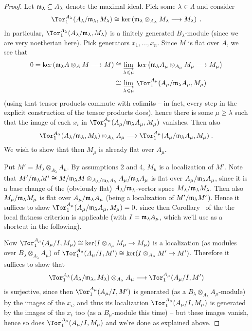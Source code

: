 \documentclass[a4paper,parskip=half,numbers=enddot, DIV=12]{scrreprt}
\renewcommand{\geq}{\geqslant}
\renewcommand{\leq}{\leqslant}
\begin{document}
\begin{proof}
	Let $\mathfrak{m}_\lambda\subseteq A_\lambda$ denote the maximal ideal. Pick some $\lambda\in\Lambda$ and consider
	\begin{align*}
	\Tor_1^{A_\lambda}(A_\lambda/\mm_\lambda,M_\lambda)\cong\ker\left(\mm_\lambda\otimes_{A_\lambda}M_\lambda\morphism M_\lambda\right)\;.
	\end{align*}
	In particular, $\Tor_1^{A_\lambda}(A_\lambda/\mm_\lambda,M_\lambda)$ is a finitely generated $B_\lambda$-module (since we are very noetherian here). Pick generators $x_1,\ldots,x_n$. Since $M$ is flat over $A$, we see that
	\begin{align*}
	0=\ker\left(\mm_\lambda A\otimes_AM\morphism M\right)&\cong\colimit[\lambda\leq\mu]\ker\left(\mm_\lambda A_\mu\otimes_{A_\mu}M_\mu\morphism M_\mu\right)\\
	&\cong \colimit[\lambda\leq\mu]\Tor_1^{A_\mu}(A_\mu/\mm_\lambda A_\mu,M_\mu)
	\end{align*}
	(using that tensor products commute with colimits -- in fact, every step in the explicit construction of the tensor products does), hence there is some $\mu\geq \lambda$ such that the image of each $x_i$ in $\Tor_1^{A_\mu}(A_\mu/\mm_\lambda A_\mu,M_\mu)$ vanishes. Then also \begin{align*}
	\Tor_1^{A_\lambda}(A_\lambda/\mm_\lambda,M_\lambda)\otimes_{A_\lambda}A_\mu\morphism \Tor_1^{A_{\mu}}(A_\mu/\mm_\lambda A_\mu,M_\mu)\;.
	\end{align*}
	We wish to show that then $M_\mu$ is already flat over $A_\mu$.
	
	Put $M'=M_\lambda\otimes_{A_\lambda}A_\mu$. By assumptions 2 and 4, $M_\mu$ is a localization of $M'$. Note that $M'/\mathfrak{m}_\lambda M'\cong M/\mathfrak{m}_\lambda M\otimes_{A_\lambda/\mathfrak{m}_\lambda A_\lambda}A_\mu/\mathfrak{m}_\lambda A_\mu$ is flat over $A_\mu/\mathfrak{m}_\lambda A_\mu$, since it is a base change of the (obviously flat) $A_\lambda/\mathfrak{m}_\lambda$-vector space $M_\lambda/\mathfrak{m}_\lambda M_\lambda$. Then also $M_\mu/\mathfrak{m}_\lambda M_\mu$ is flat over $A_\mu/\mathfrak{m}_\lambda A_\mu$ (being a localization of $M'/\mathfrak{m}_\lambda M'$). Hence it suffices to show $\Tor_1^{A_\mu}(A_\mu/\mm_\lambda A_\mu,M_\mu)=0$, since then Corollary~ of the the local flatness criterion is applicable (with $I=\mathfrak{m}_\lambda A_\mu$, which we'll use as a shortcut in the following).
	
	Now $\Tor_1^{A_\mu}(A_\mu/I,M_\mu)\cong\ker(I\otimes_{A_\mu}M_\mu\morphism M_\mu)$ is a localization (as modules over $B_\lambda\otimes_{A_\lambda}A_\mu$) of $\Tor_1^{A_\mu}(A_\mu/I,M')\cong\ker(I\otimes_{A_\mu}M'\morphism M')$. Therefore it suffices to show that
	\begin{align}\lbl{eq:TorEpi}
	\Tor_1^{A_\lambda}(A_\lambda/\mm_\lambda,M_\lambda)\otimes_{A_\lambda}A_\mu\morphism \Tor_1^{A_{\mu}}(A_\mu/I,M')
	\end{align}
	is surjective, since then $\Tor_1^{A_{\mu}}(A_\mu/I,M')$ is generated (as a $B_\lambda\otimes_{A_\lambda}A_\mu$-module) by the images of the $x_i$, and thus its localization $\Tor_1^{A_\mu}(A_\mu/I,M_\mu)$ is generated by the images of the $x_i$  too (as a $B_\mu$-module this time) -- but these images vanish, hence so does $\Tor_1^{A_\mu}(A_\mu/I,M_\mu)$ and we're done as explained above.
	

\end{proof}
\end{document}
